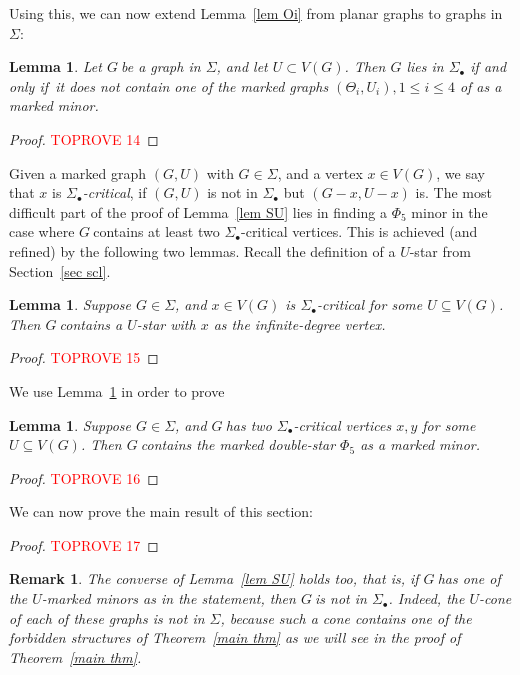 \documentclass{article}
\newtheorem{remark}{Remark}
\newcommand{\SU}{\ensuremath{\Sig_\bullet}}
\newcommand{\mm}{marked minor}
\newcommand{\umm}{\ensuremath{U}-marked minor}
\newcommand{\Sig}{\ensuremath{\Sigma}}
\newcommand{\defi}[1]{{\color{darkgray}\emph{#1}}}
\newtheorem{lemma}[proposition]{Lemma}
\newcommand{\g}{\ensuremath{G\ }}
\newcommand{\Lr}[1]{Lemma~\ref{#1}}
\newcommand{\Tr}[1]{Theorem~\ref{#1}}
\newcommand{\Sr}[1]{Section~\ref{#1}}
\renewcommand{\iff}{if and only if}
\begin{document}
Using this, we can now extend \Lr{lem Oi} from planar graphs to graphs in \Sig:

\begin{lemma} \label{lem STh}
Let \g be a  graph in \Sig, and let $U\subset V(G)$. Then $G$ lies in  $\SU$ \iff\ it does not contain one of the marked graphs $(\Theta_i,U_i), 1\leq i \leq 4$ of  as a marked minor. 
\end{lemma}
\begin{proof}\textcolor{red}{TOPROVE 14}\end{proof}

Given a marked graph $(G,U)$ with $G\in \Sig$, and a vertex $x\in V(G)$, we say that $x$ is \defi{\SU-critical}, if $(G,U)$ is not in $\SU$ but $(G-x,U-x)$ is. The most difficult part of the proof of \Lr{lem SU} lies in finding a $\Phi_5$ minor in the case where \g contains at least two \SU-critical vertices. This is achieved (and refined) by the following two lemmas. Recall the definition of a $U$-star from \Sr{sec scl}.

\begin{lemma} \label{lem SU star}
Suppose $G \in \Sig$, and $x\in V(G)$ is \SU-critical for some $U\subseteq V(G)$. Then \g contains a $U$-star with $x$ as the infinite-degree vertex.
\end{lemma}
\begin{proof}\textcolor{red}{TOPROVE 15}\end{proof}

We use \Lr{lem SU star} in order to prove 

\begin{lemma} \label{lem SU dstar}
Suppose $G \in \Sig$, and \g has two \SU-critical vertices $x,y$ for some $U\subseteq V(G)$. Then \g contains  the marked double-star $\Phi_5$ as a \mm. \end{lemma}
\begin{proof}\textcolor{red}{TOPROVE 16}\end{proof}

We can now prove the main result of this section:

\begin{proof}\textcolor{red}{TOPROVE 17}\end{proof}

\begin{remark}
\textup{The converse of \Lr{lem SU} holds too, that is, if \g has one of the \umm s as in the statement, then \g is not in \SU. Indeed, the $U$-cone of each of these graphs is not in \Sig,  because such a cone contains one of the forbidden structures of \Tr{main thm} as we will see in the proof of \Tr{main thm}.} 
\end{remark}
\end{document}
